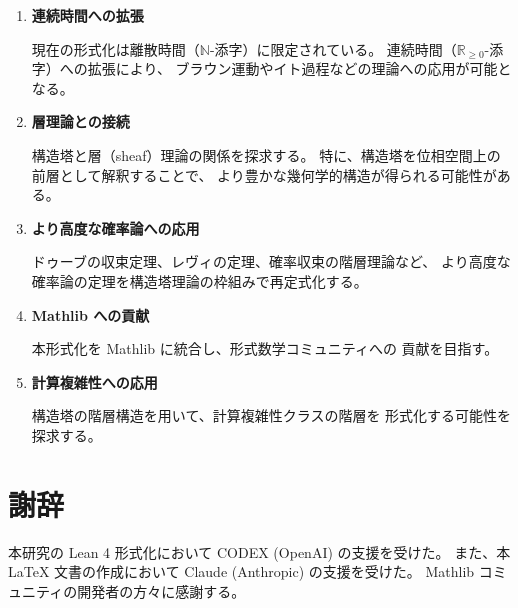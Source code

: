 \documentclass[11pt,a4paper]{article}
\theoremstyle{plain}
\theoremstyle{definition}
\newcommand{\NN}{\mathbb{N}}
\newcommand{\RR}{\mathbb{R}}
\begin{document}
\begin{enumerate}[label=\textbf{(\arabic*)}]
  \item \textbf{連続時間への拡張}
  
  現在の形式化は離散時間（$\NN$-添字）に限定されている。
  連続時間（$\RR_{\geq 0}$-添字）への拡張により、
  ブラウン運動やイト過程などの理論への応用が可能となる。
  
  \item \textbf{層理論との接続}
  
  構造塔と層（sheaf）理論の関係を探求する。
  特に、構造塔を位相空間上の前層として解釈することで、
  より豊かな幾何学的構造が得られる可能性がある。
  
  \item \textbf{より高度な確率論への応用}
  
  ドゥーブの収束定理、レヴィの定理、確率収束の階層理論など、
  より高度な確率論の定理を構造塔理論の枠組みで再定式化する。
  
  \item \textbf{Mathlib への貢献}
  
  本形式化を Mathlib に統合し、形式数学コミュニティへの
  貢献を目指す。
  
  \item \textbf{計算複雑性への応用}
  
  構造塔の階層構造を用いて、計算複雑性クラスの階層を
  形式化する可能性を探求する。
\end{enumerate}

\section*{謝辞}

本研究の Lean 4 形式化において CODEX (OpenAI) の支援を受けた。
また、本 \LaTeX{} 文書の作成において Claude (Anthropic) の支援を受けた。
Mathlib コミュニティの開発者の方々に感謝する。
\end{document}

